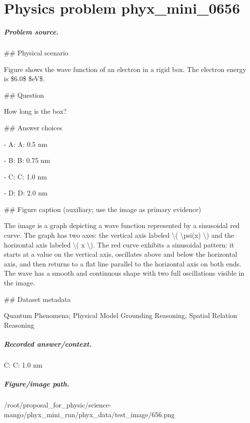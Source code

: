 
\chapter{Physics problem phyx\_mini\_0656}
\label{ch:PhyXMiniProblems_problem_phyx_mini_0656}

\paragraph{Problem source.}
\#\# Physical scenario

Figure shows the wave function of an electron in a rigid box. The electron energy is \$6.0\$ \$eV\$.

\#\# Question

How long is the box?

\#\# Answer choices

- A: A: 0.5 nm

- B: B: 0.75 nm

- C: C: 1.0 nm

- D: D: 2.0 nm

\#\# Figure caption (auxiliary; use the image as primary evidence)

The image is a graph depicting a wave function represented by a sinusoidal red curve. The graph has two axes: the vertical axis labeled \textbackslash{}( \textbackslash{}psi(x) \textbackslash{}) and the horizontal axis labeled \textbackslash{}( x \textbackslash{}). The red curve exhibits a sinusoidal pattern: it starts at a value on the vertical axis, oscillates above and below the horizontal axis, and then returns to a flat line parallel to the horizontal axis on both ends. The wave has a smooth and continuous shape with two full oscillations visible in the image.

\#\# Dataset metadata

Quantum Phenomena; Physical Model Grounding Reasoning, Spatial Relation Reasoning

\paragraph{Recorded answer/context.}
C: C: 1.0 nm

\paragraph{Figure/image path.}
/root/proposal\_for\_physic/science-mango/phyx\_mini\_run/phyx\_data/test\_image/656.png

